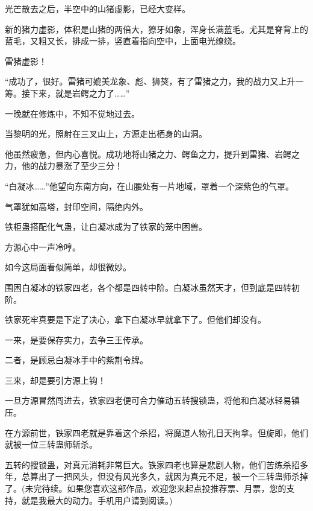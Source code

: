 \begin{this_body}
光芒散去之后，半空中的山猪虚影，已经大变样。

新的猪力虚影，体积是山猪的两倍大，獠牙如象，浑身长满蓝毛。尤其是脊背上的蓝毛，又粗又长，排成一排，竖直着指向空中，上面电光缭绕。

雷猪虚影！

“成功了，很好。雷猪可媲美龙象、彪、狮獒，有了雷猪之力，我的战力又上升一筹。接下来，就是岩鳄之力了……”

一晚就在修炼中，不知不觉地过去。

当黎明的光，照射在三叉山上，方源走出栖身的山洞。

他虽然疲惫，但内心喜悦。成功地将山猪之力、鳄鱼之力，提升到雷猪、岩鳄之力，他的战力暴涨了至少三分！

“白凝冰……”他望向东南方向，在山腰处有一片地域，罩着一个深紫色的气罩。

气罩犹如高塔，封印空间，隔绝内外。

铁柜蛊搭配化气蛊，让白凝冰成为了铁家的笼中困兽。

方源心中一声冷哼。

如今这局面看似简单，却很微妙。

围困白凝冰的铁家四老，各个都是四转中阶。白凝冰虽然天才，但到底是四转初阶。

铁家死牢真要是下定了决心，拿下白凝冰早就拿下了。但他们却没有。

一来，是要保存实力，去争三王传承。

二者，是顾忌白凝冰手中的紫荆令牌。

三来，却是要引方源上钩！

一旦方源冒然闯进去，铁家四老便可合力催动五转搜锁蛊，将他和白凝冰轻易镇压。

在方源前世，铁家四老就是靠着这个杀招，将魔道人物孔日天拘拿。但旋即，他们就被一位三转蛊师斩杀。

五转的搜锁蛊，对真元消耗非常巨大。铁家四老也算是悲剧人物，他们苦练杀招多年，总算出了一把风头，但没有风光多久，就因为真元不足，被一个三转蛊师杀掉了。(未完待续。如果您喜欢这部作品，欢迎您来起点投推荐票、月票，您的支持，就是我最大的动力。手机用户请到阅读。)

\end{this_body}

